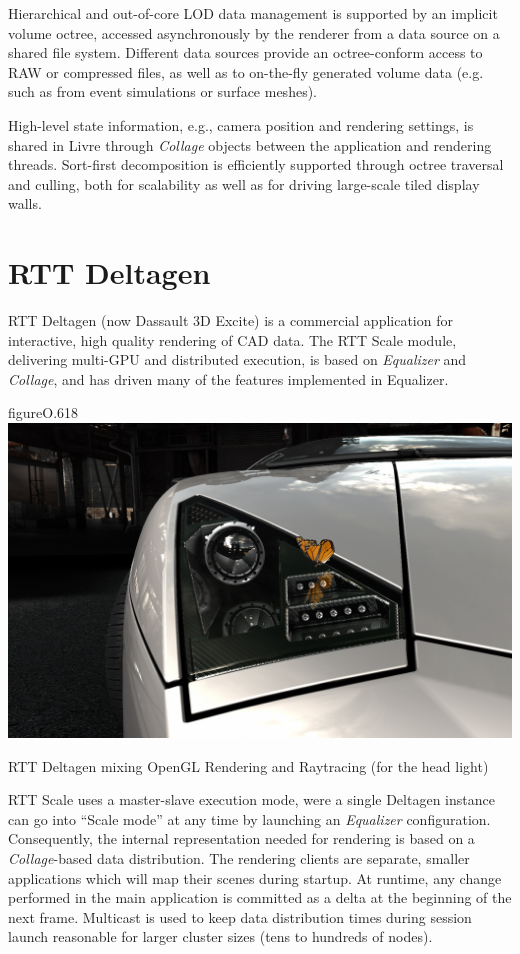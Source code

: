 Hierarchical and out-of-core LOD data management is supported by an implicit
volume octree, accessed asynchronously by the renderer from a data source on a
shared file system. Different data sources provide an octree-conform access to
RAW or compressed files, as well as to on-the-fly generated volume data (e.g.
such as from event simulations or surface meshes).

High-level state information, e.g., camera position and rendering settings, is
shared in Livre through {\em Collage} objects between the application and
rendering threads. Sort-first decomposition is efficiently supported through
octree traversal and culling, both for scalability as well as for driving
large-scale tiled display walls.

\section{RTT Deltagen}

RTT Deltagen (now Dassault 3D Excite) is a commercial application for
interactive, high quality rendering of CAD data. The RTT Scale module,
delivering multi-GPU and distributed execution, is based on {\em Equalizer}
and {\em Collage}, and has driven many of the features implemented in
Equalizer.

\begin{wrapfloat}{figure}{O}{.618\textwidth}
  \includegraphics[width=.618\textwidth]{images/DeltaGen}
  {\caption{\label{fDeltaGen}RTT Deltagen mixing OpenGL Rendering and Raytracing (for the head light)}}
\end{wrapfloat}

RTT Scale uses a master-slave execution mode, were a single Deltagen instance
can go into ``Scale mode'' at any time by launching an {\em Equalizer}
configuration. Consequently, the internal representation needed for rendering
is based on a {\em Collage}-based data distribution. The rendering clients
are separate, smaller applications which will map their scenes during startup.
At runtime, any change performed in the main application is committed as a
delta at the beginning of the next frame. Multicast is used to keep data
distribution times during session launch reasonable for larger cluster sizes
(tens to hundreds of nodes).

